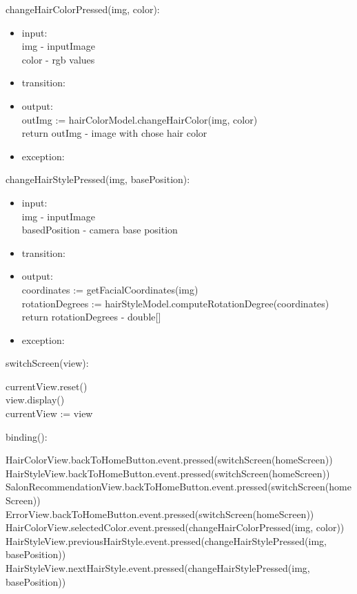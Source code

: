 \documentclass[12pt, titlepage]{article}
\begin{document}
\noindent changeHairColorPressed(img, color):
\begin{itemize}
\item input: \\
img - inputImage \\
color - rgb values
\item transition:
\item output: \\
outImg := hairColorModel.changeHairColor(img, color) \\
return outImg - image with chose hair color
\item exception:
\end{itemize}

\noindent changeHairStylePressed(img, basePosition):
\begin{itemize}
\item input: \\
img - inputImage \\
basedPosition - camera base position
\item transition:
\item output: \\
coordinates := getFacialCoordinates(img) \\
rotationDegrees := hairStyleModel.computeRotationDegree(coordinates) \\
return rotationDegrees - double[]
\item exception:
\end{itemize}

\noindent switchScreen(view):
\begin{itemize}
currentView.reset() \\
view.display() \\
currentView := view \\
\end{itemize}

\noindent binding():
\begin{itemize}
HairColorView.backToHomeButton.event.pressed(switchScreen(homeScreen)) \\
HairStyleView.backToHomeButton.event.pressed(switchScreen(homeScreen)) \\
SalonRecommendationView.backToHomeButton.event.pressed(switchScreen(homeScreen)) \\
ErrorView.backToHomeButton.event.pressed(switchScreen(homeScreen)) \\
HairColorView.selectedColor.event.pressed(changeHairColorPressed(img, color)) \\
HairStyleView.previousHairStyle.event.pressed(changeHairStylePressed(img, basePosition)) \\
HairStyleView.nextHairStyle.event.pressed(changeHairStylePressed(img, basePosition)) \\
\end{itemize}
\end{document}
